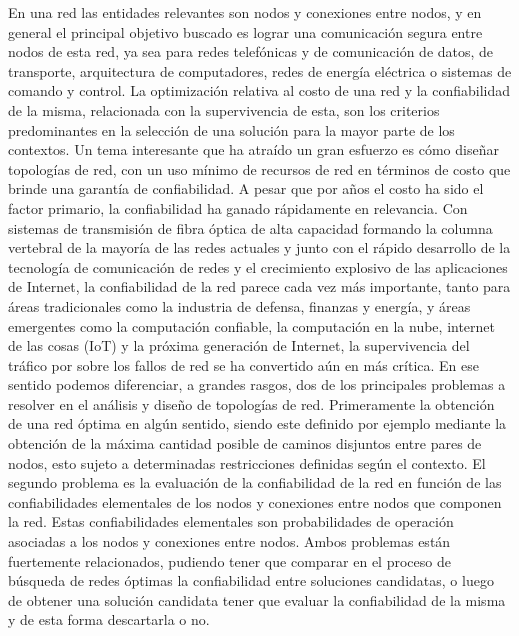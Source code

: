 \begin{foreignabstract}
En una red las entidades relevantes son nodos y conexiones entre nodos, y en general el principal objetivo buscado es lograr una comunicaci\'on segura entre nodos de esta red, ya sea para redes telef\'onicas y de comunicaci\'on de datos, de transporte, arquitectura de computadores, redes de energ\'ia el\'ectrica o sistemas de comando y control. 
La optimizaci\'on relativa al costo de una red y la confiabilidad de la misma, relacionada con la supervivencia de esta, son los criterios predominantes en la selecci\'on de una soluci\'on para la mayor parte de los contextos. Un tema interesante que ha atra\'ido un gran esfuerzo es c\'omo dise\~nar topolog\'ias de red, con un uso m\'inimo de recursos de red en t\'erminos de costo que brinde una garant\'ia de confiabilidad. A pesar que por a\~nos el costo ha sido el factor primario, la confiabilidad ha ganado r\'apidamente en relevancia. Con sistemas de transmisi\'on de fibra \'optica de alta capacidad formando la columna vertebral de la mayor\'ia de las redes actuales y junto con el r\'apido desarrollo de la tecnolog\'ia de comunicaci\'on de redes y el crecimiento explosivo de las aplicaciones de Internet, la confiabilidad de la red parece cada vez m\'as importante, tanto para \'areas tradicionales como la industria de defensa, finanzas y energ\'ia, y \'areas emergentes como la computaci\'on confiable, la computaci\'on en la nube, internet de las cosas (IoT) y la pr\'oxima generaci\'on de Internet, la supervivencia del tr\'afico por sobre los fallos de red se ha convertido a\'un en m\'as cr\'itica.
En ese sentido podemos diferenciar, a grandes rasgos, dos de los principales problemas a resolver en el an\'alisis y dise\~no de topolog\'ias de red. Primeramente la obtenci\'on de una red \'optima en alg\'un sentido, siendo este definido por ejemplo mediante la obtenci\'on de la m\'axima cantidad posible de caminos disjuntos entre pares de nodos, esto sujeto a determinadas restricciones definidas seg\'un el contexto. El segundo problema es la evaluaci\'on de la confiabilidad de la red en funci\'on de las confiabilidades elementales de los nodos y conexiones entre nodos que componen la red. Estas confiabilidades elementales son probabilidades de operaci\'on asociadas a los nodos y conexiones entre nodos. Ambos problemas est\'an fuertemente relacionados, pudiendo tener que comparar en el proceso de b\'usqueda de redes \'optimas la confiabilidad entre soluciones candidatas, o luego de obtener una soluci\'on candidata tener que evaluar la confiabilidad de la misma y de esta forma descartarla o no.

\end{foreignabstract}
